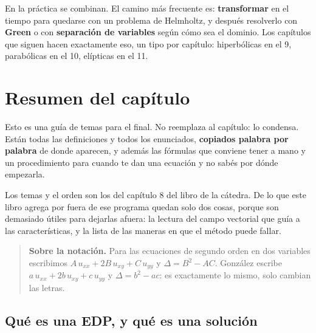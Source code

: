 \documentclass[
  spanish,
  a4paper,
]{scrbook}
\theoremstyle{definition}
\theoremstyle{plain}
\theoremstyle{definition}
\theoremstyle{plain}
\theoremstyle{definition}
\theoremstyle{remark}
\begin{document}
En la práctica se combinan. El camino más frecuente es:
\textbf{transformar} en el tiempo para quedarse con un problema de
Helmholtz, y después resolverlo con \textbf{Green} o con
\textbf{separación de variables} según cómo sea el dominio. Los
capítulos que siguen hacen exactamente eso, un tipo por capítulo:
hiperbólicas en el 9, parabólicas en el 10, elípticas en el 11.

\section{Resumen del capítulo}\label{sec-resumen}

Esto es una guía de temas para el final. No reemplaza al capítulo: lo
condensa. Están todas las definiciones y todos los enunciados,
\textbf{copiados palabra por palabra} de donde aparecen, y además las
fórmulas que conviene tener a mano y un procedimiento para cuando te dan
una ecuación y no sabés por dónde empezarla.

Los temas y el orden son los del capítulo 8 del libro de la cátedra. De
lo que este libro agrega por fuera de ese programa quedan solo dos
cosas, porque son demasiado útiles para dejarlas afuera: la lectura del
campo vectorial que guía a las características, y la lista de las
maneras en que el método puede fallar.

\begin{quote}
\textbf{Sobre la notación.} Para las ecuaciones de segundo orden en dos
variables escribimos \(A\,u_{xx} + 2B\,u_{xy} + C\,u_{yy}\) y
\(\Delta = B^2-AC\). González escribe
\(a\,u_{xx} + 2b\,u_{xy} + c\,u_{yy}\) y \(\Delta = b^2-ac\): es
exactamente lo mismo, solo cambian las letras.
\end{quote}

\subsection{Qué es una EDP, y qué es una solución}\label{sec-resumen-1}
\end{document}
